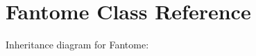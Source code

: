 \hypertarget{class_fantome}{}\section{Fantome Class Reference}
\label{class_fantome}


Inheritance diagram for Fantome\+:
